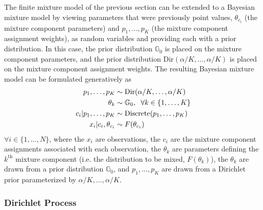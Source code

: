 \documentclass[smallcondensed, final]{svjour3}
\begin{document}
The finite mixture model of the previous section can be extended to a Bayesian mixture model by viewing parameters that were previously point values, $\theta_{c_{i}}$ (the mixture component parameters) and $p_{1}, \ldots, p_{K}$ (the mixture component assignment weights), as random variables and providing each with a prior distribution. In this case, the prior distribution $\mathbb{G}_{0}$ is placed on the mixture component parameters, and the prior distribution $\text{Dir}(\alpha/K, \ldots, \alpha/K)$ is placed on the mixture component assignment weights. The resulting Bayesian mixture model can be formulated generatively as
\begin{align}
\begin{split}
\label{bayesian_mixture_model}
	p_{1}, \ldots, p_{K}  &\sim  \text{Dir}(\alpha/K, \ldots, \alpha/K)\\
		\theta_{k}  &\sim  \mathbb{G}_{0}, \hspace{2mm} \forall k \in \{1, \ldots, K\} \\
	c_{i}|p_{1}, \ldots, p_{K}  &\sim  \text{Discrete}(p_{1}, \ldots, p_{K}) \\
	x_{i}|c_{i}, \theta_{c_{i}}  &\sim  F(\theta_{c_{i}})
\end{split}
\end{align}
$\forall i \in \{ 1, \ldots, N \}$, where the $x_{i}$ are observations, the $c_{i}$ are the mixture component assignments associated with each observation, the $\theta_{k}$ are parameters defining the $k^{\text{th}}$ mixture component (i.e. the distribution to be mixed, $F(\theta_{k})$), the $\theta_{k}$ are drawn from a prior distribution $\mathbb{G}_{0}$, and $p_{1}, \ldots, p_{K}$ are drawn from a Dirichlet prior parameterized by $\alpha/K, \ldots, \alpha/K$.






\subsubsection{Dirichlet Process}
\label{sec:dirichlet_process}

\end{document}
